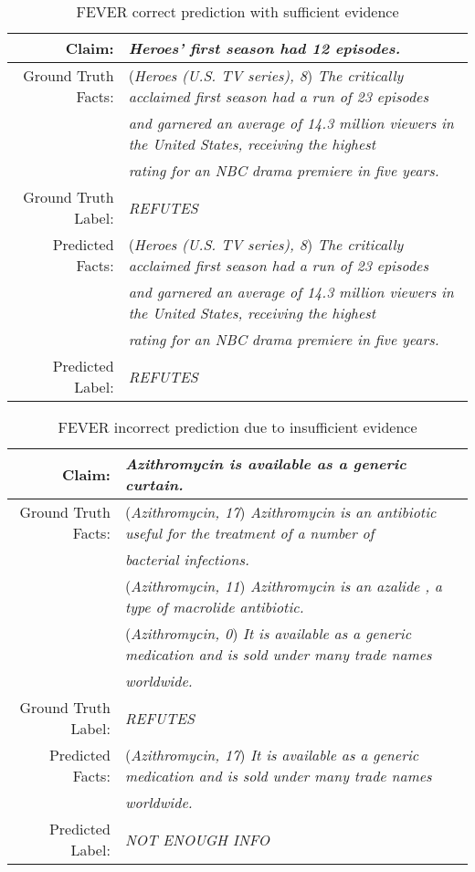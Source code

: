 \documentclass[11pt,a4paper]{article}
\begin{document}
\begin{table*}[t]
\centering
\small
\begin{tabular}{rl}
\toprule
Claim: & \textit{Heroes' first season had 12 episodes.}\\
\midrule

Ground Truth Facts: & (\textit{Heroes (U.S. TV series), 8}) \textit{The critically acclaimed first season had a run of 23 episodes}\\ &  \textit{and garnered an average of 14.3 million viewers in the United States, receiving the highest} \\ &  \textit{rating for an NBC drama premiere in five years.}\\
Ground Truth Label: & \textit{REFUTES}\\
\midrule
Predicted Facts: & (\textit{Heroes (U.S. TV series), 8}) \textit{The critically acclaimed first season had a run of 23 episodes}\\ &  \textit{and garnered an average of 14.3 million viewers in the United States, receiving the highest} \\ &  \textit{rating for an NBC drama premiere in five years.}\\
Predicted Label: & \textit{REFUTES}\\

\bottomrule
\end{tabular}
\caption{FEVER correct prediction with sufficient evidence}
\label{table:ranker_analysis_3}
\end{table*}

\begin{table*}[t]
\centering
\small
\begin{tabular}{rl}
\toprule
Claim: & \textit{Azithromycin is available as a generic curtain.}\\
\midrule

Ground Truth Facts: & (\textit{Azithromycin, 17}) \textit{Azithromycin is an antibiotic useful for the treatment of a number of }\\ &  \textit{bacterial infections.}\\
& (\textit{Azithromycin, 11}) \textit{Azithromycin is an azalide , a type of macrolide antibiotic.}\\
& (\textit{Azithromycin, 0}) \textit{It is available as a generic medication and is sold under many trade names}\\ &  \textit{worldwide.}\\
Ground Truth Label: & \textit{REFUTES}\\
\midrule
Predicted Facts: & (\textit{Azithromycin, 17}) \textit{It is available as a generic medication and is sold under many trade names}\\ &  \textit{worldwide.}\\
Predicted Label: & \textit{NOT ENOUGH INFO}\\

\bottomrule
\end{tabular}
\caption{FEVER incorrect prediction due to insufficient evidence}
\label{table:ranker_analysis_4}
\end{table*}
\end{document}
